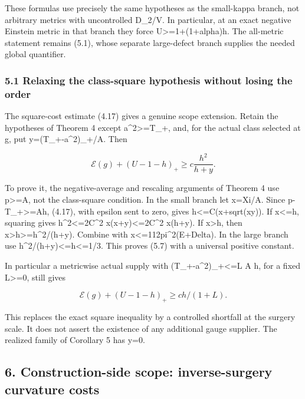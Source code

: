 \documentclass[
  10pt,
]{article}
\begin{document}
These formulas use precisely the same hypotheses as the small-kappa
branch, not arbitrary metrics with uncontrolled D\_2/V. In particular,
at an exact negative Einstein metric in that branch they force
U\textgreater=1+(1+alpha)h. The all-metric statement remains (5.1),
whose separate large-defect branch supplies the needed global
quantifier.

\hypertarget{relaxing-the-class-square-hypothesis-without-losing-the-order}{%
\subsubsection{5.1 Relaxing the class-square hypothesis without losing
the
order}\label{relaxing-the-class-square-hypothesis-without-losing-the-order}}

The square-cost estimate (4.17) gives a genuine scope extension. Retain
the hypotheses of Theorem 4 except a\^{}2\textgreater=T\_+, and, for the
actual class selected at g, put y=(T\_+-a\^{}2)\_+/A. Then

\[
 \boxed{\mathcal E(g)+(U-1-h)_+\ge c\frac{h^2}{h+y}.} \tag{5.7}
\]

To prove it, the negative-average and rescaling arguments of Theorem 4
use p\textgreater=A, not the class-square condition. In the small branch
let x=Xi/A. Since p-T\_+\textgreater=Ah, (4.17), with epsilon sent to
zero, gives h\textless=C(x+sqrt(xy)). If x\textless=h, squaring gives
h\^{}2\textless=2C\^{}2 x(x+y)\textless=2C\^{}2 x(h+y). If
x\textgreater h, then x\textgreater h\textgreater=h\^{}2/(h+y). Combine
with x\textless=112pi\^{}2(E+Delta). In the large branch use
h\^{}2/(h+y)\textless=h\textless=1/3. This proves (5.7) with a universal
positive constant.

In particular a metricwise actual supply with
(T\_+-a\^{}2)\_+\textless=L A h, for a fixed L\textgreater=0, still
gives

\[
               \mathcal E(g)+(U-1-h)_+\ge c h/(1+L). \tag{5.8}
\]

This replaces the exact square inequality by a controlled shortfall at
the surgery scale. It does not assert the existence of any additional
gauge supplier. The realized family of Corollary 5 has y=0.

\hypertarget{construction-side-scope-inverse-surgery-curvature-costs}{%
\subsection{6. Construction-side scope: inverse-surgery curvature
costs}\label{construction-side-scope-inverse-surgery-curvature-costs}}
\end{document}
